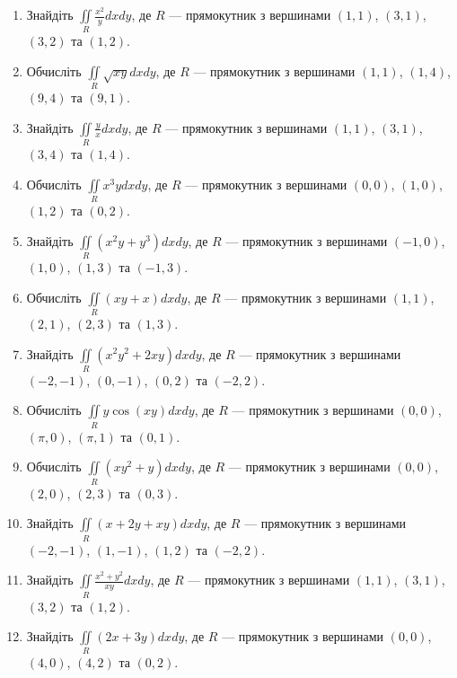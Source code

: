 \begin{enumerate}
\begin{enumerate}[label*=\arabic*.]
\item     Знайдіть $\iint\limits_{R} \frac{x^2}{y}  dx  dy$, де $R$ --- прямокутник з вершинами $(1, 1)$, $(3, 1)$, $(3, 2)$ та $(1, 2)$.
\item     Обчисліть $\iint\limits_{R} \sqrt{x y}  dx  dy$, де $R$ --- прямокутник з вершинами $(1, 1)$, $(1, 4)$, $(9, 4)$ та $(9, 1)$.
\item     Знайдіть $\iint\limits_{R} \frac{y}{x}  dx  dy$, де $R$ --- прямокутник з вершинами $(1, 1)$, $(3, 1)$, $(3, 4)$ та $(1, 4)$.
\item     Обчисліть $\iint\limits_{R} x^3y  dx  dy$, де $R$ --- прямокутник з вершинами $(0, 0)$, $(1, 0)$, $(1, 2)$ та $(0, 2)$.
\item     Знайдіть $\iint\limits_{R} (x^2y + y^3)  dx  dy$, де $R$ --- прямокутник з вершинами $(-1, 0)$, $(1, 0)$, $(1, 3)$ та $(-1, 3)$.
\item     Обчисліть $\iint\limits_{R} (xy + x)  dx  dy$, де $R$ --- прямокутник з вершинами $(1, 1)$, $(2, 1)$, $(2, 3)$ та $(1, 3)$.
\item     Знайдіть $\iint\limits_{R} (x^2y^2 + 2xy)  dx  dy$, де $R$ --- прямокутник з вершинами $(-2, -1)$, $(0, -1)$, $(0, 2)$ та $(-2, 2)$.
\item     Обчисліть $\iint\limits_{R} y \cos(xy)  dx  dy$, де $R$ --- прямокутник з вершинами $(0, 0)$, $(\pi, 0)$, $(\pi, 1)$ та $(0, 1)$.
\item     Обчисліть $\iint\limits_{R} (xy^2 + y)  dx  dy$, де $R$ --- прямокутник з вершинами $(0, 0)$, $(2, 0)$, $(2, 3)$ та $(0, 3)$.
\item     Знайдіть $\iint\limits_{R} (x + 2y + xy)  dx  dy$, де $R$ --- прямокутник з вершинами $(-2, -1)$, $(1, -1)$, $(1, 2)$ та $(-2, 2)$.
\item     Знайдіть $\iint\limits_{R} \frac{x^2 + y^2}{xy}  dx  dy$, де $R$ --- прямокутник з вершинами $(1, 1)$, $(3, 1)$, $(3, 2)$ та $(1, 2)$.
\item     Знайдіть $\iint\limits_{R} (2x + 3y) d x d y$, де $R$ --- прямокутник з вершинами $(0, 0)$, $(4, 0)$, $(4, 2)$ та $(0, 2)$.
\end{enumerate}
\end{enumerate}

